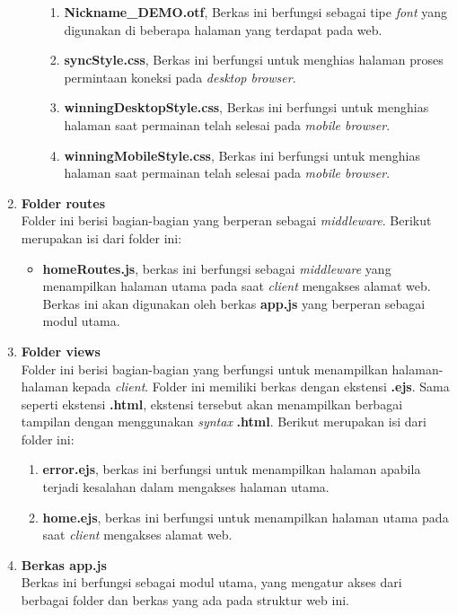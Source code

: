 \begin{enumerate}
\begin{enumerate}
\begin{enumerate}
			\item \textbf{Nickname\_DEMO.otf}, Berkas ini berfungsi sebagai tipe \textit{font} yang digunakan di beberapa halaman yang terdapat pada web.
			
			\item \textbf{syncStyle.css}, Berkas ini berfungsi untuk menghias halaman proses permintaan koneksi pada \textit{desktop browser}.
			
			\item \textbf{winningDesktopStyle.css}, Berkas ini berfungsi untuk menghias halaman saat permainan telah selesai pada \textit{mobile browser}.
			
			\item \textbf{winningMobileStyle.css}, Berkas ini berfungsi untuk menghias halaman saat permainan telah selesai pada \textit{mobile browser}.
			
			
		\end{enumerate}
	\end{enumerate}
	
	\item \textbf{Folder routes} \\
	Folder ini berisi bagian-bagian yang berperan sebagai \textit{middleware}. Berikut merupakan isi dari folder ini:
	\begin{itemize}
		\item \textbf{homeRoutes.js}, berkas ini berfungsi sebagai \textit{middleware} yang menampilkan halaman utama pada saat \textit{client} mengakses alamat web. Berkas ini akan digunakan oleh berkas \textbf{app.js} yang berperan sebagai modul utama.
	\end{itemize}

	\item \textbf{Folder views} \\
	Folder ini berisi bagian-bagian yang berfungsi untuk menampilkan halaman-halaman kepada \textit{client}. Folder ini memiliki berkas dengan ekstensi \textbf{.ejs}. Sama seperti ekstensi \textbf{.html}, ekstensi tersebut akan menampilkan berbagai tampilan dengan menggunakan \textit{syntax} \textbf{.html}. Berikut merupakan isi dari folder ini:
	
	\begin{enumerate}
		\item \textbf{error.ejs}, berkas ini berfungsi untuk menampilkan halaman apabila terjadi kesalahan dalam mengakses halaman utama.
		
		\item \textbf{home.ejs}, berkas ini berfungsi untuk menampilkan halaman utama pada saat \textit{client} mengakses alamat web.
	\end{enumerate}
	
	
	\item \textbf{Berkas app.js} \\ 
	Berkas ini berfungsi sebagai modul utama, yang mengatur akses dari berbagai folder dan berkas yang ada pada struktur web ini.
\end{enumerate}